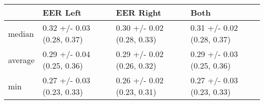 \begin{tabular}{llll}
\toprule
{} &                    EER Left &                   EER Right &                        Both \\
\midrule
median  &  0.32 +/- 0.03 (0.28, 0.37) &  0.30 +/- 0.02 (0.28, 0.33) &  0.31 +/- 0.02 (0.28, 0.37) \\
average &  0.29 +/- 0.04 (0.25, 0.36) &  0.29 +/- 0.02 (0.26, 0.32) &  0.29 +/- 0.03 (0.25, 0.36) \\
min     &  0.27 +/- 0.03 (0.23, 0.33) &  0.26 +/- 0.02 (0.23, 0.31) &  0.27 +/- 0.03 (0.23, 0.33) \\
\bottomrule
\end{tabular}
